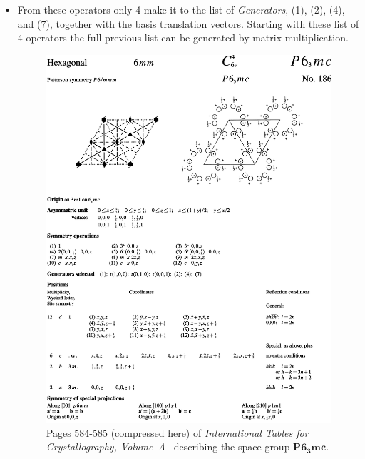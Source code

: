 \begin{itemize}
 \item From these operators only 4 make it to the list of \textit{Generators}, (1), (2), (4), and (7), together with the basis translation vectors. Starting with these list of 4 operators the full previous list can be generated by matrix multiplication.
 
\begin{figure}
    \centering
\includegraphics[width=1.\linewidth]{Figures/ITC.png}
\caption{ Pages 584-585 (compressed here) of \textit{International Tables for Crystallography, Volume~A}~\cite{IntTableCrysA} describing the space group $\mathbf{P6_3mc}$. }
\label{Fig:ITC}
\end{figure}


\end{itemize}
